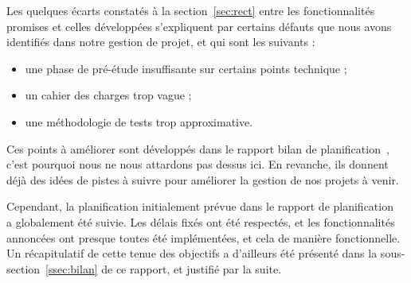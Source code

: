 Les quelques écarts constatés à la {\sc section}~\ref{sec:rect} entre les fonctionnalités promises et celles développées s'expliquent par certains défauts que nous avons identifiés dans notre gestion de projet, et qui sont les suivants : 

\begin{itemize}
\item une phase de pré-étude insuffisante sur certains points technique ;
\item un cahier des charges trop vague ;
\item une méthodologie de tests trop approximative.
\end{itemize}

Ces points à améliorer sont développés dans le rapport bilan de planification~\cite{bilanPlanif}, c'est pourquoi nous ne nous attardons pas dessus ici. En revanche, ils donnent déjà des idées de pistes à suivre pour améliorer la gestion de nos projets à venir.

Cependant, la planification initialement prévue dans le rapport de planification~\cite{planif} a globalement été suivie. Les délais fixés ont été respectés, et les fonctionnalités annoncées ont presque toutes été implémentées, et cela de manière fonctionnelle. Un récapitulatif de cette tenue des objectifs a d'ailleurs été présenté dans la {\sc sous-section}~\ref{ssec:bilan} de ce rapport, et justifié par la suite. 